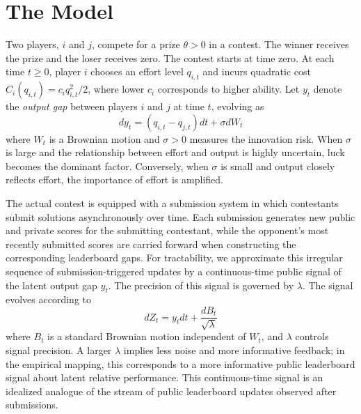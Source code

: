 \documentclass[mnsc]{informs3}
\begin{document}
\section{The Model}\label{contest-theory}

Two players, $i$ and $j$, compete for a prize $\theta>0$ in a contest.
The winner receives the prize and the loser receives zero.
The contest starts at time zero.
At each time $t\ge0$, player $i$ chooses an effort level $q_{i,t}$ and incurs quadratic cost $C_i(q_{i,t}) = c_i q_{i,t}^2/2$, where lower $c_i$ corresponds to higher ability.
Let $y_t$ denote the \textit{output gap} between players $i$ and $j$ at time $t$, evolving as
\begin{equation}\label{eq-state-dynamics}
	dy_t = (q_{i,t}-q_{j,t})dt + \sigma dW_t
\end{equation}
where $W_t$ is a Brownian motion and $\sigma>0$ measures the innovation risk.
When $\sigma$ is large and the relationship between effort and output is highly uncertain, luck becomes the dominant factor.
Conversely, when $\sigma$ is small and output closely reflects effort, the importance of effort is amplified.

The actual contest is equipped with a submission system in which contestants submit solutions asynchronously over time. Each submission generates new public and private scores for the submitting contestant, while the opponent's most recently submitted scores are carried forward when constructing the corresponding leaderboard gaps.
For tractability, we approximate this irregular sequence of submission-triggered updates by a continuous-time public signal of the latent output gap $y_t$.
The precision of this signal is governed by $\lambda$.
The signal evolves according to
\begin{equation}\label{signal}
	dZ_{t} = y_{t}dt + \frac{dB_{t}}{\sqrt{\lambda}}
\end{equation}
where $B_{t}$ is a standard Brownian motion independent of $W_t$, and $\lambda$ controls signal precision.
A larger $\lambda$ implies less noise and more informative feedback; in the empirical mapping, this corresponds to a more informative public leaderboard signal about latent relative performance.
This continuous-time signal is an idealized analogue of the stream of public leaderboard updates observed after submissions.
\end{document}
